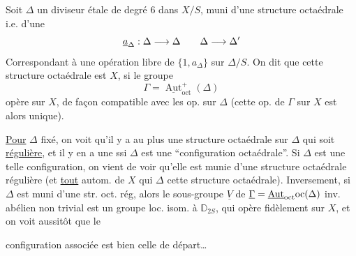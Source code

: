 Soit $\Delta$ un diviseur étale de degré $6$ dans $X/S$, muni d'une structure octaédrale i.e. d'une   
\[
\underline a_\Delta:\Delta\longrightarrow\Delta
\qquad\Delta\longrightarrow\Delta'
\]
Correspondant à une opération libre de $\{1,a_\Delta\}$ sur $\Delta/S$. On dit que cette structure octaédrale est   $X$, si le groupe
\[
\Gamma=\underline{\operatorname{Aut}}^+_{\mathrm{oct}}(\Delta)
\]
opère sur $X$, de façon compatible avec les op. sur $\Delta$ (cette op. de $\Gamma$ sur $X$ est alors unique).


\uline{Pour} $\Delta$  fixé, on voit qu'il y a au plus une structure octaédrale sur $\Delta$ qui soit \uline{régulière}, et il y en a une ssi $\Delta$ est une ``configuration octaédrale''. Si $\Delta$ est une telle configuration, on vient de voir  qu'elle est munie d'une  structure octaédrale régulière (et \uline{tout} autom. de $X$ qui   $\Delta$   cette structure octaédrale). Inversement, si $\Delta$ est muni d'une str. oct. rég, alors le sous-groupe $\underline V$ de $\underline\Gamma=\underline{\operatorname{Aut}}_{\mathrm{oct}}\mathrm{oc}(\Delta)$ inv. abélien non trivial est un groupe loc. isom. à $\mathbb D_{2S}$, qui opère fidèlement sur $X$, et on voit aussitôt que le

configuration   associée est bien celle de départ\ldots

